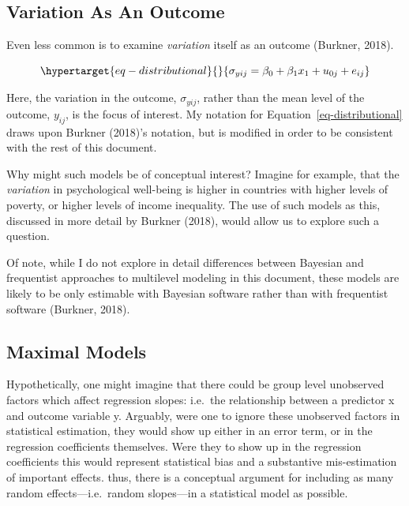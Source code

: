 \documentclass[
  letterpaper,
  DIV=11,
  numbers=noendperiod]{scrreprt}
\begin{document}
\hypertarget{variation-as-an-outcome}{%
\subsection{Variation As An Outcome}\label{variation-as-an-outcome}}

Even less common is to examine \emph{variation} itself as an outcome
(Burkner, 2018).

\begin{equation}\protect\hypertarget{eq-distributional}{}{\sigma_{yij} = \beta_0 + \beta_1 x_1 + u_{0j} + e_{ij}}\label{eq-distributional}\end{equation}

Here, the variation in the outcome, \(\sigma_{yij}\), rather than the
mean level of the outcome, \(y_{ij}\), is the focus of interest. My
notation for Equation~\ref{eq-distributional} draws upon Burkner
(2018)'s notation, but is modified in order to be consistent with the
rest of this document.

Why might such models be of conceptual interest? Imagine for example,
that the \emph{variation} in psychological well-being is higher in
countries with higher levels of poverty, or higher levels of income
inequality. The use of such models as this, discussed in more detail by
Burkner (2018), would allow us to explore such a question.

Of note, while I do not explore in detail differences between Bayesian
and frequentist approaches to multilevel modeling in this document,
these models are likely to be only estimable with Bayesian software
rather than with frequentist software (Burkner, 2018).

\hypertarget{maximal-models}{%
\subsection{Maximal Models}\label{maximal-models}}

Hypothetically, one might imagine that there could be group level
unobserved factors which affect regression slopes: i.e.~the relationship
between a predictor x and outcome variable y. Arguably, were one to
ignore these unobserved factors in statistical estimation, they would
show up either in an error term, or in the regression coefficients
themselves. Were they to show up in the regression coefficients this
would represent statistical bias and a substantive mis-estimation of
important effects. thus, there is a conceptual argument for including as
many random effects---i.e.~random slopes---in a statistical model as
possible.
\end{document}
